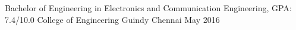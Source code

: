 
\begin{cventries}
  \cventry
    {Bachelor of Engineering in Electronics and Communication Engineering, GPA: 7.4/10.0} %
    {College of Engineering Guindy} %
    {Chennai} %
    {May 2016} %
    {}
\end{cventries}
